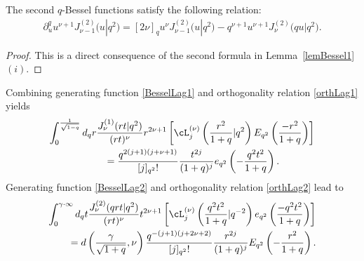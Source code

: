 \begin{corollary}
\label{lemBesselextra}
The second $q$-Bessel functions satisfy the following relation:
\begin{gather*}
\partial_u^q u^{\nu+1}J_{\nu-1}^{(2)}\big(u|q^2\big) = [2\nu]_qu^\nu J_{\nu-1}^{(2)}\big(u|q^2\big)-q^{\nu+1}u^{\nu+1}J_{\nu}^{(2)}\big(qu|q^2\big).
\end{gather*}
\end{corollary}
\begin{proof}
This is a direct consequence of the second formula in Lemma~\ref{lemBessel1}$(i)$.
\end{proof}




Combining generating function \eqref{BesselLag1} and orthogonality relation \eqref{orthLag1} yields
\begin{gather}
\int_0^{\frac{1}{\sqrt{1-q}}}d_qr \frac{J_\nu^{(1)}(rt|q^2)}{(rt)^{\nu}}r^{2\nu+1}\left[\cL_j^{(\nu)}\left(\frac{r^2}{1+q}|q^2\right)E_{q^2}\left(\frac{-r^2}{1+q}\right)\right]
\nonumber\\
\qquad {} =\frac{q^{2(j+1)(j+\nu+1)}}{[j]_{q^2}!}\frac{t^{2j}}{(1+q)^j}e_{q^2}\left(-\frac{q^2t^2}{1+q}\right).\label{preHank1}
\end{gather}
Generating function \eqref{BesselLag2} and orthogonality relation \eqref{orthLag2} lead to
\begin{gather} \int_0^{\gamma\cdot\infty}d_qt\frac{J_\nu^{(2)}(qrt|q^2)}{(rt)^{\nu}}t^{2\nu+1}\left[\cL_j^{(\nu)}
\left(\frac{q^2t^2}{1+q}|q^{-2}\right)e_{q^2}\left(\frac{-q^2t^2}{1+q}\right)\right]\nonumber\\
\qquad {}= d\left(\frac{\gamma}{\sqrt{1+q}},\nu\right)\frac{q^{-(j+1)(j+2\nu+2)}}{[j]_{q^2}!}\frac{r^{2j}}{(1+q)^j}E_{q^2}
\left(-\frac{r^2}{1+q}\right).\label{preHank2}
\end{gather}

